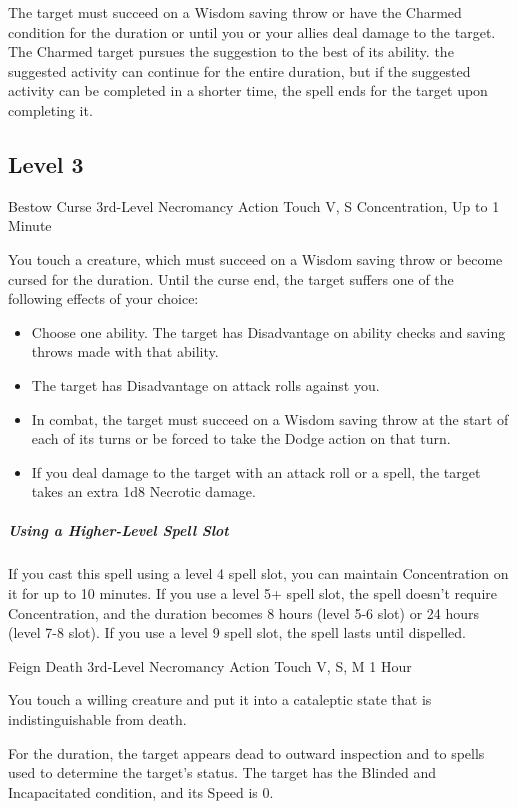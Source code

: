 \documentclass[letterpaper,openany,oneside,twocolumn]{book}
\begin{document}
The target must succeed on a Wisdom saving throw or have the Charmed condition for the duration or until you or your allies deal damage to the target. The Charmed target pursues the suggestion to the best of its ability. the suggested activity can continue for the entire duration, but if the suggested activity can be completed in a shorter time, the spell ends for the target upon completing it.

\subsection*{Level 3}

\DndSpellHeader
  {Bestow Curse}
  {3rd-Level Necromancy}
  {Action}
  {Touch}
  {V, S}
  {Concentration, Up to 1 Minute}

You touch a creature, which must succeed on a Wisdom saving throw or become cursed for the duration. Until the curse end, the target suffers one of the following effects of your choice:
\begin{itemize}
	\item Choose one ability. The target has Disadvantage on ability checks and saving throws made with that ability.
	\item The target has Disadvantage on attack rolls against you.
	\item In combat, the target must succeed on a Wisdom saving throw at the start of each of its turns or be forced to take the Dodge action on that turn.
	\item If you deal damage to the target with an attack roll or a spell, the target takes an extra 1d8 Necrotic damage.
\end{itemize}

\subparagraph*{Using a Higher-Level Spell Slot} If you cast this spell using a level 4 spell slot, you can maintain Concentration on it for up to 10 minutes. If you use a level 5+ spell slot, the spell doesn't require Concentration, and the duration becomes 8 hours (level 5-6 slot) or 24 hours (level 7-8 slot). If you use a level 9 spell slot, the spell lasts until dispelled.

\DndSpellHeader
  {Feign Death}
  {3rd-Level Necromancy}
  {Action}
  {Touch}
  {V, S, M}
  {1 Hour}

You touch a willing creature and put it into a cataleptic state that is indistinguishable from death.

For the duration, the target appears dead to outward inspection and to spells used to determine the target's status. The target has the Blinded and Incapacitated condition, and its Speed is 0.
\end{document}
